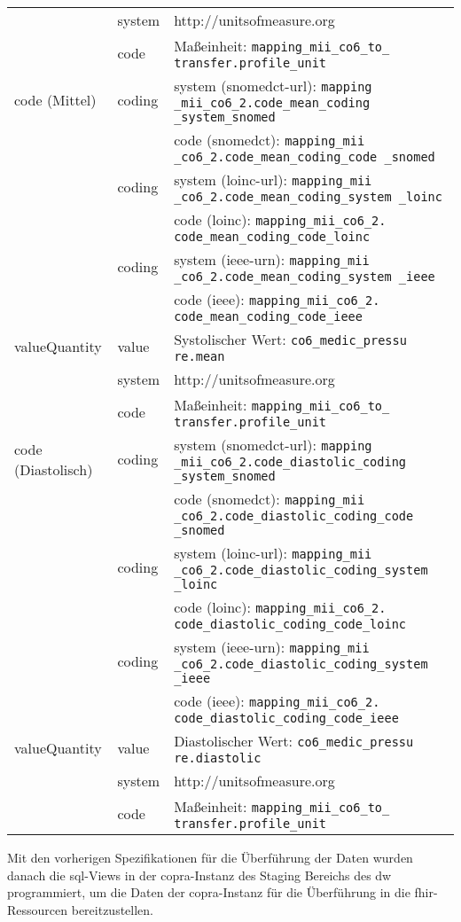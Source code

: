 \begin{longtable}{|l|l|p{7cm}|}
	\cline{2-3}
	& system & http://unitsofmeasure.org \\ 
	\cline{2-3}
	& code & Maßeinheit: \texttt{mapping\_mii\_co6\_to\_ transfer.profile\_unit} \\ \hline
	code (Mittel) & coding & system (\ac{snomedct}-\acs{url}): \texttt{mapping \_mii\_co6\_2.code\_mean\_coding \_system\_snomed} \\ 
	\cline{3-3} 
	&  & code (\ac{snomedct}): \texttt{mapping\_mii \_co6\_2.code\_mean\_coding\_code \_snomed} \\
	\cline{2-3} 
	& coding & system (\ac{loinc}-\ac{url}): \texttt{mapping\_mii \_co6\_2.code\_mean\_coding\_system \_loinc} \\ 
	\cline{3-3} 
	&  & code (\ac{loinc}): \texttt{mapping\_mii\_co6\_2. code\_mean\_coding\_code\_loinc} \\ 
	\cline{2-3} 
	&  coding & system (\ac{ieee}-\acs{urn}): \texttt{mapping\_mii \_co6\_2.code\_mean\_coding\_system \_ieee} \\ 
	\cline{3-3} 
	&  & code (\ac{ieee}): \texttt{mapping\_mii\_co6\_2. code\_mean\_coding\_code\_ieee} \\ \hline
	valueQuantity & value & Systolischer Wert: \texttt{co6\_medic\_pressu re.mean} \\
	\cline{2-3}
	& system & http://unitsofmeasure.org \\ 
	\cline{2-3}
	& code & Maßeinheit: \texttt{mapping\_mii\_co6\_to\_ transfer.profile\_unit} \\ \hline
	code (Diastolisch) & coding & system (\ac{snomedct}-\acs{url}): \texttt{mapping \_mii\_co6\_2.code\_diastolic\_coding \_system\_snomed} \\ 
	\cline{3-3} 
	&  & code (\ac{snomedct}): \texttt{mapping\_mii \_co6\_2.code\_diastolic\_coding\_code \_snomed} \\
	\cline{2-3} 
	&  coding & system (\ac{loinc}-\ac{url}): \texttt{mapping\_mii \_co6\_2.code\_diastolic\_coding\_system \_loinc} \\ 
	\cline{3-3} 
	&  & code (\ac{loinc}): \texttt{mapping\_mii\_co6\_2. code\_diastolic\_coding\_code\_loinc} \\ 
	\cline{2-3} 
	&  coding & system (\ac{ieee}-\acs{urn}): \texttt{mapping\_mii \_co6\_2.code\_diastolic\_coding\_system \_ieee} \\ 
	\cline{3-3} 
	&  & code (\ac{ieee}): \texttt{mapping\_mii\_co6\_2. code\_diastolic\_coding\_code\_ieee} \\ \hline
	valueQuantity & value & Diastolischer Wert: \texttt{co6\_medic\_pressu re.diastolic} \\
	\cline{2-3}
	& system & http://unitsofmeasure.org \\ 
	\cline{2-3}
	& code & Maßeinheit: \texttt{mapping\_mii\_co6\_to\_ transfer.profile\_unit} \\ \hline
\end{longtable}

Mit den vorherigen Spezifikationen für die Überführung der Daten wurden danach die \ac{sql}-Views in der \ac{copra}-Instanz des Staging Bereichs des \ac{dw} programmiert, um die Daten der \ac{copra}-Instanz für die Überführung in die \ac{fhir}-Ressourcen bereitzustellen.
